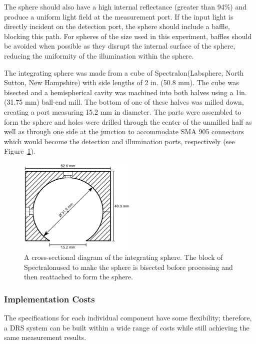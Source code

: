 The sphere should also have a high internal reflectance (greater than 94\%) and produce a uniform light field at the measurement port.\cite{Labsphereb,Labspherea,Labsphere} If the input light is directly incident on the detection port, the sphere should include a baffle, blocking this path. For spheres of the size used in this experiment, baffles should be avoided when possible as they disrupt the internal surface of the sphere, reducing the uniformity of the illumination within the sphere.

The integrating sphere was made from a cube of Spectralon\textregistered (Labsphere\textregistered, North Sutton, New Hampshire) with side lengths of 2 in. (50.8 mm). The cube was bisected and a hemispherical cavity was machined into both halves using a 1\textonequarter in. (31.75 mm) ball-end mill. The bottom of one of these halves was milled down, creating a port measuring 15.2 mm in diameter. The parts were assembled to form the sphere and holes were drilled through the center of the unmilled half as well as through one side at the junction to accommodate SMA 905 connectors which would become the detection and illumination ports, respectively (see Figure~\ref{fig:p1-intsphere_schematic}).

\begin{figure}
	\centering \includegraphics[width=0.5\textwidth]{figures/p1-intsphere_schematic.png}
	\caption[Cross-sectional diagram of the integrating sphere]{\label{fig:p1-intsphere_schematic}A cross-sectional diagram of the integrating sphere. The block of Spectralon\textregistered used to make the sphere is bisected before processing and then reattached to form the sphere.}
\end{figure}

\subsubsection{Implementation Costs}
The specifications for each individual component have some flexibility; therefore, a DRS system can be built within a wide range of costs while still achieving the same measurement results.

